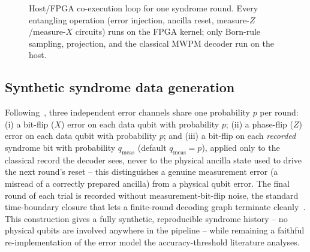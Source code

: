 \documentclass[pdflatex,sn-mathphys,Numbered]{sn-jnl}
\begin{document}
\begin{figure}[t]
\centering
{}
\caption{Host/FPGA co-execution loop for one syndrome round. Every entangling operation (error injection, ancilla reset, measure-$Z$/measure-$X$ circuits) runs on the FPGA kernel; only Born-rule sampling, projection, and the classical MWPM decoder run on the host.}
\label{fig:pipeline}
\end{figure}

\subsection{Synthetic syndrome data generation}\label{sec:protocol-noise}

Following~\cite{dennis2002}, three independent error channels share one probability $p$ per round: (i) a bit-flip ($X$) error on each data qubit with probability $p$; (ii) a phase-flip ($Z$) error on each data qubit with probability $p$; and (iii) a bit-flip on each \emph{recorded} syndrome bit with probability $q_{\mathrm{meas}}$ (default $q_{\mathrm{meas}}=p$), applied only to the classical record the decoder sees, never to the physical ancilla state used to drive the next round's reset -- this distinguishes a genuine measurement error (a misread of a correctly prepared ancilla) from a physical qubit error. The final round of each trial is recorded without measurement-bit-flip noise, the standard time-boundary closure that lets a finite-round decoding graph terminate cleanly~\cite{dennis2002,fowler2012}. This construction gives a fully synthetic, reproducible syndrome history -- no physical qubits are involved anywhere in the pipeline -- while remaining a faithful re-implementation of the error model the accuracy-threshold literature analyses.
\end{document}
